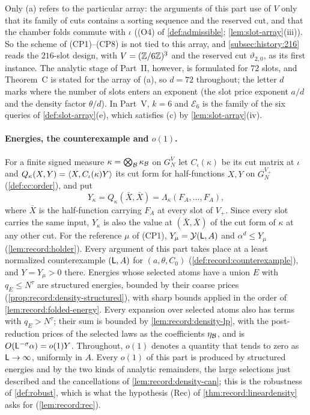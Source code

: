 Only (a) refers to the particular array: the arguments of this part use of
$V$ only that its family of cuts contains a sorting sequence and the reserved
cut, and that the chamber folds commute with $\iota$ ((O4) of
\cref{def:admissible}; \cref{lem:slot-array}(iii)). So the scheme of
(CP1)--(CP8) is not tied to this array, and \cref{subsec:history:216} reads
the $216$-slot design, with $V=(\mathbb Z/6\mathbb Z)^3$ and the reserved cut
$\vartheta_{2,0}$, as its first instance. The analytic stage of Part~II,
however, is formulated for $72$ slots, and Theorem~C is stated for the array
of (a), so $d=72$ throughout; the letter $d$ marks where the number of slots
enters an exponent (the slot price exponent $a/d$ and the density factor
$\theta/d$). In Part~V,
$k=6$ and $\mathcal E_6$ is the family of the six queries of
\cref{def:slot-array}(e), which satisfies (c) by \cref{lem:slot-array}(iv).

\paragraph{Energies, the counterexample and $o(1)$.}
For a finite signed measure $\kappa=\bigotimes_{\mathcal B}\kappa_{\mathcal B}$ on
$G_N^V$ let $C_\iota(\kappa)$ be its cut matrix at $\iota$ and
$Q_\kappa(X,Y)=\left\langle X,C_\iota(\kappa)Y\right\rangle$ its cut form for half-functions $X,Y$
on $G_N^{V_+}$ (\cref{def:cc:order}), and put
\[
 Y_\kappa=Q_\kappa(\bar X,\bar X)=\Lambda_\kappa(F_A,\dots,F_A),
\]
where $\bar X$ is the half-function carrying $F_A$ at every slot of $V_+$.
Since every slot carries the same input, $Y_\kappa$ is also the value at
$(\bar X,\bar X)$ of the cut form of $\kappa$ at any other cut. For the
reference $\mu$ of (CP1), $Y_\mu=\mathcal Y(\mathsf L,A)$ and $\alpha^d\le Y_\mu$
(\cref{lem:record:holder}). Every argument of this part takes place at a
least normalized counterexample $(\mathsf L,A)$ for $(a,\theta,C_0)$
(\cref{def:record:counterexample}), and $Y=Y_\mu>0$ there. Energies whose
selected atoms have a union $E$ with $q_E\le N^\tau$ are structured energies,
bounded by their coarse prices (\cref{prop:record:density-structured}), with
sharp bounds applied in the order of \cref{lem:record:folded-energy}. Every
expansion over selected atoms also has terms with $q_E>N^\tau$; their sum is
bounded by
\cref{lem:record:density-lp}, with the post-reduction prices of the selected
laws as the coefficients $\eta_{\mathcal B}$, and is $O(\mathsf L^{-\sigma}\alpha)=o(1)Y$. Throughout,
$o(1)$ denotes a quantity that tends to zero as $\mathsf L\to\infty$, uniformly in
$A$. Every $o(1)$ of this part is produced by structured energies and by the
two kinds of analytic remainders, the large selections just described and
the cancellations of \cref{lem:record:density-can}; this is the robustness of
\cref{def:robust}, which is what the hypothesis (Rec) of
\cref{thm:record:lineardensity} asks for (\cref{lem:record:rec}).

